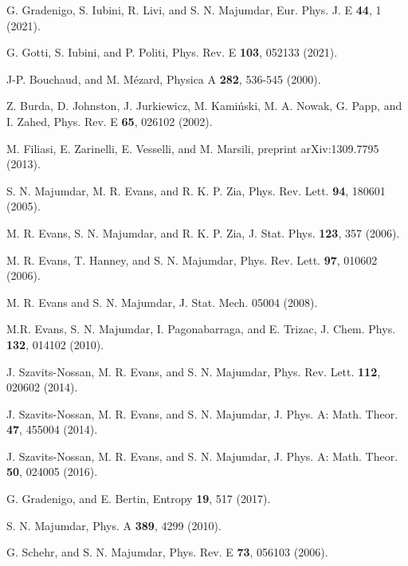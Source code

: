 \documentclass[aps,pre,twocolumn,superscriptaddress,showpacs]{revtex4-1}
\begin{document}
\begin{thebibliography}{10}
 G. Gradenigo, S. Iubini, R. Livi, and S. N. Majumdar, Eur. Phys. J. E {\bf 44}, 1 (2021).

 G. Gotti, S. Iubini, and P. Politi, Phys. Rev. E {\bf 103}, 052133 (2021).

 J-P. Bouchaud, and M. M\'ezard, Physica A {\bf 282}, 536-545 (2000).

 Z. Burda, D. Johnston, J. Jurkiewicz, M. Kami\'nski, M. A. Nowak, G. Papp, and I. Zahed, Phys. Rev. E {\bf 65}, 026102 (2002).%

 M. Filiasi, E. Zarinelli, E. Vesselli, and M. Marsili, preprint arXiv:1309.7795 (2013).

 S. N. Majumdar, M. R. Evans, and R. K. P. Zia, Phys. Rev. Lett. {\bf 94}, 180601 (2005).%

 M. R. Evans, S. N. Majumdar, and R. K. P. Zia, J. Stat. Phys. {\bf 123}, 357 (2006).

 M. R. Evans, T. Hanney, and S. N. Majumdar, Phys. Rev. Lett. {\bf 97}, 010602 (2006).

 M. R. Evans and S. N. Majumdar, J. Stat. Mech. 05004 (2008).

 M.R. Evans, S. N. Majumdar, I. Pagonabarraga, and E. Trizac, J. Chem. Phys. {\bf 132}, 014102 (2010).

 J. Szavits-Nossan, M. R. Evans, and S. N. Majumdar, Phys. Rev. Lett. {\bf 112}, 020602 (2014).%

 J. Szavits-Nossan, M. R. Evans, and S. N. Majumdar, J. Phys. A: Math. Theor. {\bf 47}, 455004 (2014).%

 J. Szavits-Nossan, M. R. Evans, and S. N. Majumdar, J. Phys. A: Math. Theor. {\bf 50}, 024005 (2016).%

 G. Gradenigo, and E. Bertin, Entropy {\bf 19}, 517 (2017).%


 S. N. Majumdar, Phys. A {\bf 389}, 4299 (2010).

 G. Schehr, and S. N. Majumdar, Phys. Rev. E {\bf 73}, 056103 (2006).




\end{thebibliography}
\end{document}
